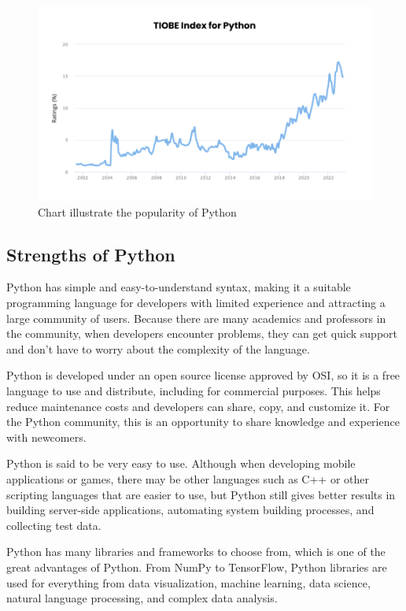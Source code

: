 \documentclass[12pt]{article}
\begin{document}
\begin{figure}[h!]
\begin{center}
\includegraphics[width=11.5cm]{Python3.png}\\
Chart illustrate the popularity of Python
\end{center}
\end{figure}

\subsection{Strengths of Python}
Python has simple and easy-to-understand syntax, making it a suitable programming language for developers with limited experience and attracting a large community of users. Because there are many academics and professors in the community, when developers encounter problems, they can get quick support and don’t have to worry about the complexity of the language.

Python is developed under an open source license approved by OSI, so it is a free language to use and distribute, including for commercial purposes. This helps reduce maintenance costs and developers can share, copy, and customize it. For the Python community, this is an opportunity to share knowledge and experience with newcomers.

Python is said to be very easy to use. Although when developing mobile applications or games, there may be other languages such as C++ or other scripting languages that are easier to use, but Python still gives better results in building server-side applications, automating system building processes, and collecting test data.

Python has many libraries and frameworks to choose from, which is one of the great advantages of Python. From NumPy to TensorFlow, Python libraries are used for everything from data visualization, machine learning, data science, natural language processing, and complex data analysis.
\end{document}
